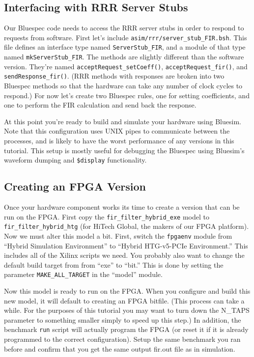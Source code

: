 \documentclass{article}
\begin{document}
\subsection{Interfacing with RRR Server Stubs}

Our Bluespec code needs to access the RRR server stubs in order to respond to requests from software. First let's include \texttt{asim/rrr/server\_stub\_FIR.bsh}.
This file defines an interface type named \texttt{ServerStub\_FIR}, and a module of that type named \texttt{mkServerStub\_FIR}. The methods are slightly different
than the software version. They're named \texttt{acceptRequest\_setCoeff()}, \texttt{acceptRequest\_fir()}, and \texttt{sendResponse\_fir()}. (RRR methods with
responses are broken into two Bluespec methods so that the hardware can take any number of clock cycles to respond.) For now let's create two Bluespec rules, one
for setting coefficients, and one to perform the FIR calculation and send back the response.

At this point you're ready to build and simulate your hardware using Bluesim. Note that this configuration uses UNIX pipes to communicate between the processes,
and is likely to have the worst performance of any versions in this tutorial. This setup is mostly useful for debugging the Bluespec using Bluesim's waveform
dumping and \texttt{\$display} functionality.

\subsection{Creating an FPGA Version}


Once your hardware component works its time to create a version that can be run on the FPGA. First copy the
\texttt{fir\_filter\_hybrid\_exe} model to \texttt{fir\_filter\_hybrid\_htg} (for HiTech Global, the makers of our FPGA platform).
Now we must alter this model a bit. First, switch the \texttt{fpgaenv} module from ``Hybrid Simulation Environment'' to ``Hybrid
HTG-v5-PCIe Environment.'' This includes all of the Xilinx scripts we need. You probably also want to change the default build
target from from ``exe'' to ``bit.'' This is done by setting the parameter \texttt{MAKE\_ALL\_TARGET} in the ``model'' module.

Now this model is ready to run on the FPGA. When you configure and build this new model, it will default to creating an FPGA bitfile. (This process can take a
while. For the purposes of this tutorial you may want to turn down the N\_TAPS parameter to something smaller simply to speed up this step.) In addition, the
benchmark \texttt{run} script will actually program the FPGA (or reset it if it is already programmed to the correct configuration). Setup the same benchmark you
ran before and confirm that you get the same output fir.out file as in simulation. 
\end{document}

